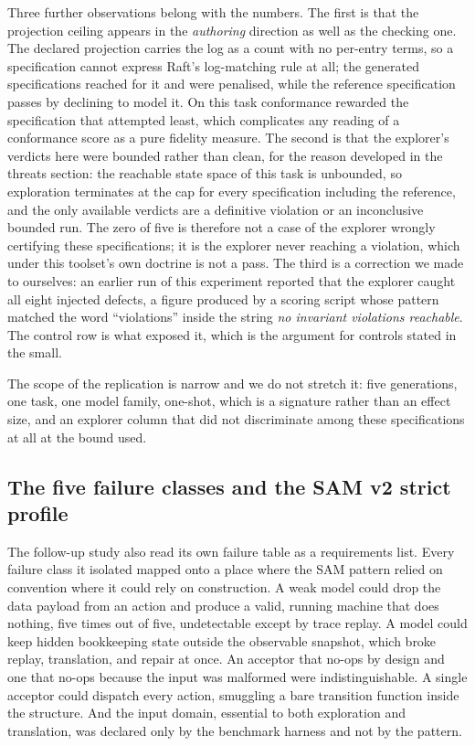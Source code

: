 \documentclass[11pt]{article}
\begin{document}
Three further observations belong with the numbers. The first is that the
projection ceiling appears in the \emph{authoring} direction as well as the
checking one. The declared projection carries the log as a count with no
per-entry terms, so a specification cannot express Raft's log-matching rule at
all; the generated specifications reached for it and were penalised, while the
reference specification passes by declining to model it. On this task conformance
rewarded the specification that attempted least, which complicates any reading of
a conformance score as a pure fidelity measure. The second is that the explorer's
verdicts here were bounded rather than clean, for the reason developed in the
threats section: the reachable state space of this task is unbounded, so
exploration terminates at the cap for every specification including the
reference, and the only available verdicts are a definitive violation or an
inconclusive bounded run. The zero of five is therefore not a case of the
explorer wrongly certifying these specifications; it is the explorer never
reaching a violation, which under this toolset's own doctrine is not a pass.
The third is a correction we made to ourselves: an earlier run of this experiment
reported that the explorer caught all eight injected defects, a figure produced
by a scoring script whose pattern matched the word ``violations'' inside the
string \emph{no invariant violations reachable}. The control row is what exposed
it, which is the argument for controls stated in the small.

The scope of the replication is narrow and we do not stretch it: five
generations, one task, one model family, one-shot, which is a signature rather
than an effect size, and an explorer column that did not discriminate among these
specifications at all at the bound used.

\subsection{The five failure classes and the SAM v2 strict profile}

The follow-up study also read its own failure table as a requirements list.
Every failure class it isolated mapped onto a place where the SAM pattern
relied on convention where it could rely on construction. A weak model could
drop the data payload from an action and produce a valid, running machine that
does nothing, five times out of five, undetectable except by trace replay. A
model could keep hidden bookkeeping state outside the observable snapshot,
which broke replay, translation, and repair at once. An acceptor that no-ops
by design and one that no-ops because the input was malformed were
indistinguishable. A single acceptor could dispatch every action, smuggling a
bare transition function inside the structure. And the input domain, essential
to both exploration and translation, was declared only by the benchmark
harness and not by the pattern.
\end{document}
